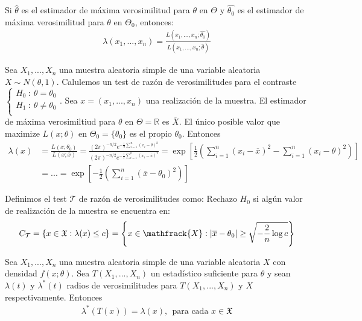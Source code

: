 \begin{obs}
Si $\hat{\theta}$ es el estimador de máxima verosimilitud para $\theta$ en $\Theta$ y $\hat{\theta_0}$ es el estimador de máxima verosimilitud para $\theta$ en $\Theta_0$, entonces:
\begin{align*}
    \lambda(x_1,...,x_n) = \frac{L(x_1,...,x_n;\hat{\theta_0})}{L(x_1,...,x_n;\hat{\theta})}
\end{align*}
\end{obs}

\begin{ejemplo}
Sea $X_1,...,X_n$ una muestra aleatoria simple de una variable aleatoria $X \sim N(\theta,1)$. Calulemos un test de razón de verosimilitudes para el contraste $
    \left\{ \begin{array}{lcc}
             H_0 \ : \ \theta = \theta_0\\
             H_1 \ : \ \theta \not = \theta_0 \\
             \end{array}
   \right.
$. 
Sea $x = (x_1,...,x_n)$ una realización de la muestra. El estimador de máxima verosimiltiud para $\theta$ en $\Theta = \mathbb{R}$ es $\overline{X}$. El único posible valor que maximize $L(x;\theta)$ en $\Theta_0 = \{\theta_0\}$ es el propio $\theta_0$. Entonces
\begin{align*}
    \lambda(x) &= \frac{L(x;\theta_0)}{L(x;\overline{x})} = \frac{(2\pi)^{-n/2}e^{-\frac{1}{2} \sum_{i=1}^{n} (x_i -\theta)^2} }{(2\pi)^{-n/2}e^{-\frac{1}{2} \sum_{i=1}^{n} (x_i -\overline{x})^2}} 
    = \exp\left[ \frac{1}{2}\left(\sum_{i=1}^{n} (x_i -\overline{x})^2 - \sum_{i=1}^{n} (x_i -\theta)^2\right) \right] \\
    & = ... = \exp\left[ -\frac{1}{2}\left(\sum_{i=1}^{n} (\overline{x} -\theta_0)^2 \right) \right]
\end{align*}
\end{ejemplo}
Definimos el test $\mathcal{T}$ de razón de verosimilitudes como: Rechazo $H_0$ si algún valor de realización de la muestra se encuentra en:
\begin{align*}
    C_{\mathcal{T}} = \{ x \in \mathfrak{X} : \lambda(x) \leq c\} = \left\{ x \in \mathfrack{X} : |\overline{x} - \theta_0| \ge \sqrt{-\frac{2}{n}\log c}\right\}
\end{align*}

\begin{teo}
Sea $X_1,...,X_n$ una muestra aleatoria simple de una variable aleatoria $X$ con densidad $f(x;\theta)$. Sea $T(X_1,...,X_n)$ un estadístico suficiente para $\theta$ y sean $\lambda(t)$ y $\lambda^*(t)$ radios de verosimilitudes para $T(X_1,...,X_n)$ y $X$ respectivamente. Entonces
\begin{align*}
    \lambda^*(T(x)) = \lambda(x), \ \ \text{para cada } x \in \mathfrak{X}
\end{align*}
\end{teo}


